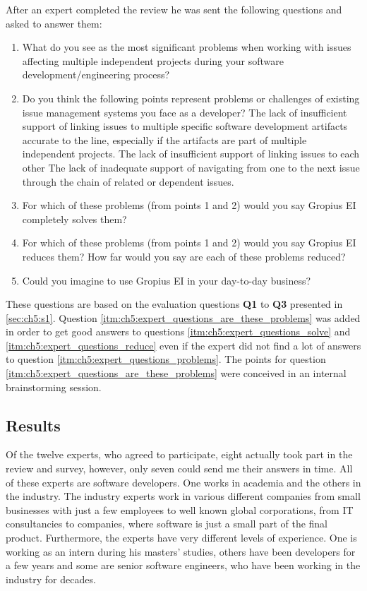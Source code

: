 After an expert completed the review he was sent the following questions and asked to answer them:
\begin{enumerate}
	\item What do you see as the most significant problems when working with issues affecting multiple independent projects during your software development/engineering process? \label{itm:ch5:expert_questions_problems}
	\item Do you think the following points represent problems or challenges of existing issue management systems you face as a developer? \label{itm:ch5:expert_questions_are_these_problems}
	\subitem The lack of insufficient support of linking issues to multiple specific software development artifacts accurate to the line, especially if the artifacts are part of multiple independent projects.\label{itm:ch5:expert_questions_are_these_problems_1}
	\subitem The lack of insufficient support of linking issues to each other \label{itm:ch5:expert_questions_are_these_problems_2}
	\subitem The lack of inadequate support of navigating from one to the next issue through the chain of related or dependent issues. \label{itm:ch5:expert_questions_are_these_problems_3}
	\item For which of these problems (from points 1 and 2) would you say Gropius EI completely solves them? \label{itm:ch5:expert_questions_solve}
	\item For which of these problems (from points 1 and 2) would you say Gropius EI reduces them? \label{itm:ch5:expert_questions_reduce}
	\subitem How far would you say are each of these problems reduced?
	\item Could you imagine to use Gropius EI in your day-to-day business?
\end{enumerate}
These questions are based on the evaluation questions \textbf{Q1} to \textbf{Q3} presented in \cref{sec:ch5:s1}.
Question \ref{itm:ch5:expert_questions_are_these_problems} was added in order to get good answers to questions \ref{itm:ch5:expert_questions_solve} and \ref{itm:ch5:expert_questions_reduce} even if the expert did not find a lot of answers to question \ref{itm:ch5:expert_questions_problems}.
The points for question \ref{itm:ch5:expert_questions_are_these_problems} were conceived in an internal brainstorming session.

\subsection{Results}
\label{ssec:ch5:ss2.2}
Of the twelve experts, who agreed to participate, eight actually took part in the review and survey,
however, only seven could send me their answers in time.
All of these experts are software developers.
One works in academia and the others in the industry.
The industry experts work in various different companies from small businesses with just a few employees to well known global corporations,
from IT consultancies to companies, where software is just a small part of the final product.
Furthermore, the experts have very different levels of experience.
One is working as an intern during his masters' studies, others have been developers for a few years and some are senior software engineers, who have been working in the industry for decades.

